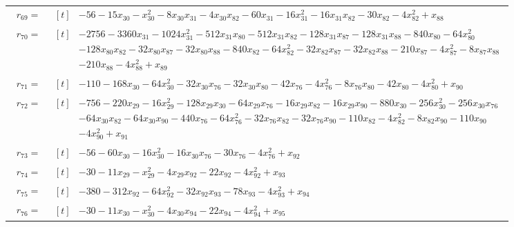 \begin{longtable}{@{}r p{0.92\linewidth}@{}}
$r_{69}=$ & $\begin{aligned}[t]&-56-15x_{30}-x_{30}^{2}-8x_{30}x_{31}-4x_{30}x_{82}-60x_{31}-16x_{31}^{2}-16x_{31}x_{82}-30x_{82}-4x_{82}^{2}+x_{88}\end{aligned}$ \\[2pt]
$r_{70}=$ & $\begin{aligned}[t]&-2756-3360x_{31}-1024x_{31}^{2}-512x_{31}x_{80}-512x_{31}x_{82}-128x_{31}x_{87}-128x_{31}x_{88}-840x_{80}-64x_{80}^{2}\\[-1pt] &-128x_{80}x_{82}-32x_{80}x_{87}-32x_{80}x_{88}-840x_{82}-64x_{82}^{2}-32x_{82}x_{87}-32x_{82}x_{88}-210x_{87}-4x_{87}^{2}-8x_{87}x_{88}\\[-1pt] &-210x_{88}-4x_{88}^{2}+x_{89}\end{aligned}$ \\[2pt]
$r_{71}=$ & $\begin{aligned}[t]&-110-168x_{30}-64x_{30}^{2}-32x_{30}x_{76}-32x_{30}x_{80}-42x_{76}-4x_{76}^{2}-8x_{76}x_{80}-42x_{80}-4x_{80}^{2}+x_{90}\end{aligned}$ \\[2pt]
$r_{72}=$ & $\begin{aligned}[t]&-756-220x_{29}-16x_{29}^{2}-128x_{29}x_{30}-64x_{29}x_{76}-16x_{29}x_{82}-16x_{29}x_{90}-880x_{30}-256x_{30}^{2}-256x_{30}x_{76}\\[-1pt] &-64x_{30}x_{82}-64x_{30}x_{90}-440x_{76}-64x_{76}^{2}-32x_{76}x_{82}-32x_{76}x_{90}-110x_{82}-4x_{82}^{2}-8x_{82}x_{90}-110x_{90}\\[-1pt] &-4x_{90}^{2}+x_{91}\end{aligned}$ \\[2pt]
$r_{73}=$ & $\begin{aligned}[t]&-56-60x_{30}-16x_{30}^{2}-16x_{30}x_{76}-30x_{76}-4x_{76}^{2}+x_{92}\end{aligned}$ \\[2pt]
$r_{74}=$ & $\begin{aligned}[t]&-30-11x_{29}-x_{29}^{2}-4x_{29}x_{92}-22x_{92}-4x_{92}^{2}+x_{93}\end{aligned}$ \\[2pt]
$r_{75}=$ & $\begin{aligned}[t]&-380-312x_{92}-64x_{92}^{2}-32x_{92}x_{93}-78x_{93}-4x_{93}^{2}+x_{94}\end{aligned}$ \\[2pt]
$r_{76}=$ & $\begin{aligned}[t]&-30-11x_{30}-x_{30}^{2}-4x_{30}x_{94}-22x_{94}-4x_{94}^{2}+x_{95}\end{aligned}$ \\[2pt]

\end{longtable}
